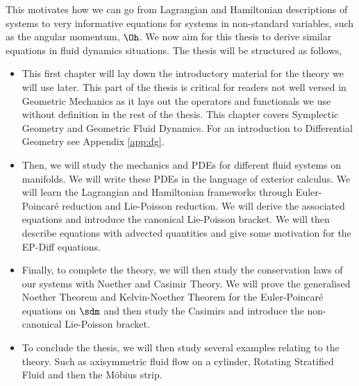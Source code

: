\noindent
This motivates how we can go from Lagrangian and Hamiltonian descriptions of systems to very informative equations for systems in non-standard variables, such as the angular momentum, $\Oh$. We now aim for this thesis to derive similar equations in fluid dynamics situations. The thesis will be structured as follows,
\begin{itemize}
  \item This first chapter will lay down the introductory material for the theory we will use later. This part of the thesis is critical for readers not well versed in Geometric Mechanics as it lays out the operators and functionals we use without definition in the rest of the thesis. This chapter covers Symplectic Geometry and Geometric Fluid Dynamics. For an introduction to Differential Geometry see Appendix \ref{app:dg}.
  \item Then, we will study the mechanics and PDEs for different fluid systems on manifolds. We will write these PDEs in the language of exterior calculus. We will learn the Lagrangian and Hamiltonian frameworks through Euler-Poincar\'e reduction and Lie-Poisson reduction. We will derive the associated equations and introduce the canonical Lie-Poisson bracket. We will then describe equations with advected quantities and give some motivation for the EP-Diff equations.
  \item Finally, to complete the theory, we will then study the conservation laws of our systems with Noether and Casimir Theory. We will prove the generalised Noether Theorem and Kelvin-Noether Theorem for the Euler-Poincar\'e equations on $\sdm$ and then study the Casimirs and introduce the non-canonical Lie-Poisson bracket.
  \item To conclude the thesis, we will then study several examples relating to the theory. Such as axisymmetric fluid flow on a cylinder, Rotating Stratified Fluid and then the M\"obius strip.
\end{itemize}

